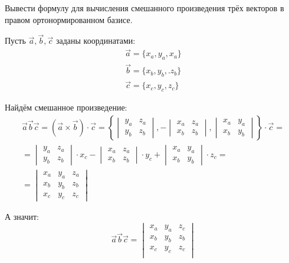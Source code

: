 \begin{question}
  Вывести формулу для вычисления смешанного произведения трёх векторов в правом ортонормированном базисе.
\end{question}
\begin{answer}
  Пусть $\vec{a}, \vec{b}, \vec{c}$ заданы координатами:
\begin{gather*}
  \vec{a} = \{x_a, y_a, x_a\} \\
  \vec{b} = \{x_b, y_b,. z_b\} \\
  \vec{c} = \{x_c, y_c, z_c\} 
\end{gather*}

Найдём смешанное произведение:
\begin{gather*}
  \vec{a} \vec{b} \vec{c} = (\vec{a} \times \vec{b}) \cdot \vec{c} = \left\{
    \begin{vmatrix}
      y_a & z_a \\
      y_b & z_b 
    \end{vmatrix},
    - \begin{vmatrix}
      x_a & z_a \\
      x_b & z_b 
    \end{vmatrix},
    \begin{vmatrix}
      x_a & y_a \\
      x_b & y_b
    \end{vmatrix}
  \right\} \cdot \vec{c} = \\
    = \begin{vmatrix}
      y_a & z_a \\
      y_b & z_b 
    \end{vmatrix} \cdot x_c
    - \begin{vmatrix}
      x_a & z_a \\
      x_b & z_b 
    \end{vmatrix} \cdot y_c
    + \begin{vmatrix}
      x_a & y_a \\
      x_b & y_b
    \end{vmatrix} \cdot z_c = \\
    =
    \begin{vmatrix}
      x_a & y_a & z_a \\
      x_b & y_b & z_b \\
      x_c & y_c & z_c 
    \end{vmatrix}
\end{gather*}

А значит: \[
\vec{a} \vec{b} \vec{c} =
\begin{vmatrix}
  x_a & y_a & z_c \\
  x_b & y_b & z_b \\
  x_c & y_c & z_c \\
\end{vmatrix}
\]
\end{answer}


